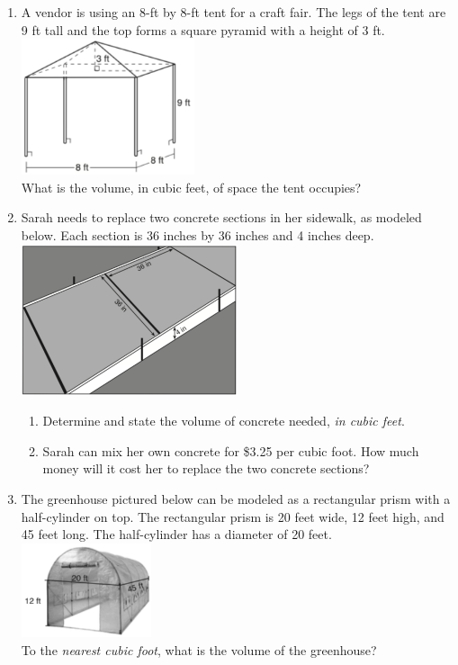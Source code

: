 \documentclass[12pt, twoside]{article}
\begin{document}
\begin{enumerate}
  \item A vendor is using an 8-ft by 8-ft tent for a craft fair. The legs of the tent are 9 ft tall and the top forms a square pyramid with a height of 3 ft.\\[1cm]
    \includegraphics[width=0.4\textwidth]{tent_Jan2019-9.png}\\[0.5cm]
    What is the volume, in cubic feet, of space the tent occupies? \vspace{3cm}

\newpage
  \item Sarah needs to replace two concrete sections in her sidewalk, as modeled below. Each section is 36 inches by 36 inches and 4 inches deep.\\[0.25cm]
    \includegraphics[width=0.5\textwidth]{walk_Aug2018-31.png}
      \begin{enumerate}
        \item Determine and state the volume of concrete needed, \emph{in cubic feet}. \vspace{1.5cm}
        \item Sarah can mix her own concrete for \$3.25 per cubic foot. How much money will it cost her to replace the two concrete sections?
    \end{enumerate} \vspace{2.5cm}

  \item The greenhouse pictured below can be modeled as a rectangular prism with a half-cylinder on top. The rectangular prism is 20 feet wide, 12 feet high, and 45 feet long. The half-cylinder has a diameter of 20 feet.\\[0.5cm]
    \includegraphics[width=0.3\textwidth]{greenhouse_Jun2018-7.png}\\
    To the \emph{nearest cubic foot}, what is the volume of the greenhouse?



\end{enumerate}
\end{document}
